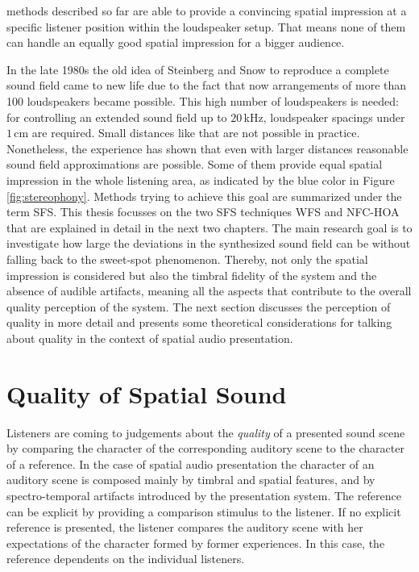  methods described so far are able to provide a
convincing spatial impression at a specific listener position within the
loudspeaker setup. That means none of them can handle an equally good spatial
impression for a bigger audience.

In the late 1980s the old idea of Steinberg and Snow to reproduce a
complete sound field came to new life due to the fact that now arrangements of
more than 100 loudspeakers became possible.\autocite{Berkhout1988}
This high number of loudspeakers is needed: for controlling an extended
sound field up to $20$\,kHz, loudspeaker spacings under $1$\,cm
are required. Small distances like that are not possible in practice. Nonetheless,
the experience has shown that even with larger distances reasonable sound field
approximations are possible. Some of them provide equal spatial impression in the
whole listening area, as indicated by the blue color in Figure\,\ref{fig:stereophony}.
Methods trying to achieve this goal are summarized under the term \acf{SFS}.
This thesis focusses on the two \ac{SFS} techniques \ac{WFS} and \ac{NFC-HOA}
that are explained in detail in the next two chapters.
The main research goal is to investigate how large the deviations in the
synthesized sound field can be without falling back to the sweet-spot
phenomenon. Thereby, not only the spatial impression is considered but also the
timbral fidelity of the system and the absence of audible artifacts,
meaning all the aspects that contribute to the overall quality
perception of the system.
The next section discusses the perception of quality in more detail and
presents some theoretical considerations for talking about quality in the context of spatial
audio presentation.


\section{Quality of Spatial Sound}
\label{sec:quality_of_spatial_sound}
%
Listeners are coming to judgements about the \emph{quality} of a
presented sound scene by
comparing the character of the corresponding auditory scene to the character of
a reference.\autocite{Blauert2003}
In the case of spatial audio presentation the character of an auditory scene is
composed mainly by timbral and spatial features, and by spectro-temporal
artifacts introduced by the presentation system.\autocite{Rumsey2002a}
The reference can be explicit by providing a comparison stimulus to the
listener. If no explicit reference is presented, the listener compares the
auditory scene with her expectations of the character formed by former
experiences. In this case,
the reference dependents on the individual listeners.

